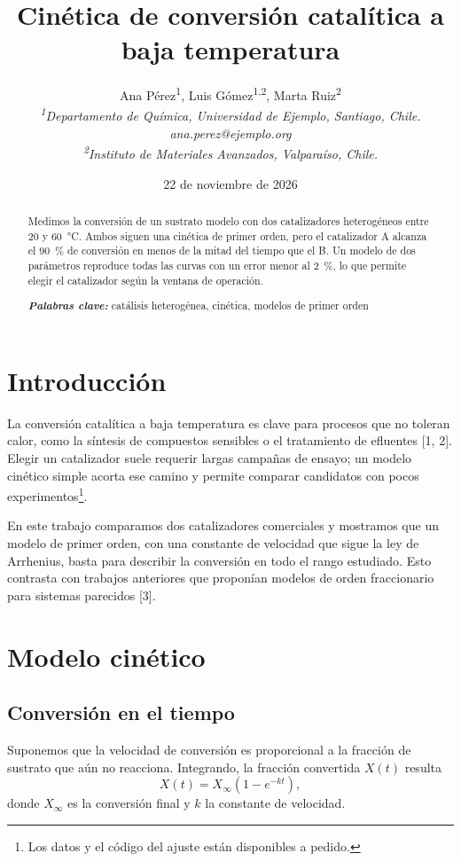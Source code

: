 \documentclass[10pt,letterpaper]{article}
\title{Cinética de conversión catalítica a baja temperatura}
\author{%
  Ana Pérez\textsuperscript{1}, Luis Gómez\textsuperscript{1,2}, Marta Ruiz\textsuperscript{2}\\[1ex]
  {\small\itshape \textsuperscript{1}Departamento de Química, Universidad de Ejemplo, Santiago, Chile. ana.perez@ejemplo.org}\\
  {\small\itshape \textsuperscript{2}Instituto de Materiales Avanzados, Valparaíso, Chile.}%
}
\date{22 de noviembre de 2026}
\begin{document}
\maketitle
\thispagestyle{plain}

\begin{abstract}
Medimos la conversión de un sustrato modelo con dos catalizadores heterogéneos entre 20 y
60~°C. Ambos siguen una cinética de primer orden, pero el catalizador A alcanza el 90~\% de
conversión en menos de la mitad del tiempo que el B. Un modelo de dos parámetros reproduce
todas las curvas con un error menor al 2~\%, lo que permite elegir el catalizador según la
ventana de operación.

\medskip
\noindent\textbf{\textit{Palabras clave:}} catálisis heterogénea, cinética, modelos de primer orden
\end{abstract}

\section{Introducción}

La conversión catalítica a baja temperatura es clave para procesos que no toleran calor, como
la síntesis de compuestos sensibles o el tratamiento de efluentes [1, 2]. Elegir un catalizador
suele requerir largas campañas de ensayo; un modelo cinético simple acorta ese camino y permite
comparar candidatos con pocos experimentos\footnote{Los datos y el código del ajuste están
disponibles a pedido.}.

En este trabajo comparamos dos catalizadores comerciales y mostramos que un modelo de primer
orden, con una constante de velocidad que sigue la ley de Arrhenius, basta para describir la
conversión en todo el rango estudiado. Esto contrasta con trabajos anteriores que proponían
modelos de orden fraccionario para sistemas parecidos [3].

\section{Modelo cinético}

\subsection{Conversión en el tiempo}

Suponemos que la velocidad de conversión es proporcional a la fracción de sustrato que aún no
reacciona. Integrando, la fracción convertida $X(t)$ resulta
\begin{equation}
X(t) = X_\infty \left(1 - e^{-k t}\right),
\end{equation}
donde $X_\infty$ es la conversión final y $k$ la constante de velocidad.
\end{document}
